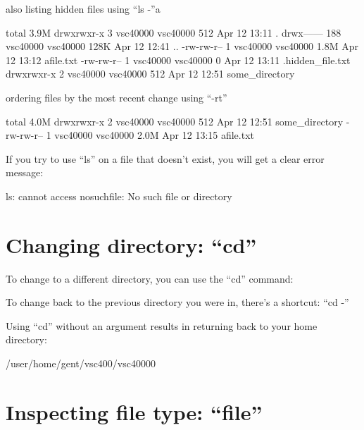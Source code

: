 \item also listing hidden files using ``ls -''a
\begin{prompt}
  total 3.9M
  drwxrwxr-x   3 vsc40000 vsc40000  512 Apr 12 13:11 .
  drwx------ 188 vsc40000 vsc40000 128K Apr 12 12:41 ..
  -rw-rw-r--   1 vsc40000 vsc40000 1.8M Apr 12 13:12 afile.txt
  -rw-rw-r--   1 vsc40000 vsc40000    0 Apr 12 13:11 .hidden_file.txt
  drwxrwxr-x   2 vsc40000 vsc40000  512 Apr 12 12:51 some_directory
\end{prompt}

\item ordering files by the most recent change using ``-rt''

\begin{prompt}
  total 4.0M
  drwxrwxr-x 2 vsc40000 vsc40000  512 Apr 12 12:51 some_directory
  -rw-rw-r-- 1 vsc40000 vsc40000 2.0M Apr 12 13:15 afile.txt
\end{prompt}

If you try to use ``ls'' on a file that doesn't exist, you will get a clear error message:

\begin{prompt}
  ls: cannot access nosuchfile: No such file or directory
\end{prompt}

\section{Changing directory: ``cd''}

To change to a different directory, you can use the ``cd'' command:

\begin{prompt}
\end{prompt}

To change back to the previous directory you were in, there's a shortcut: ``cd -''

Using ``cd'' without an argument results in returning back to your home directory:

\begin{prompt}
  /user/home/gent/vsc400/vsc40000  
\end{prompt}

\section{Inspecting file type: ``file''}

